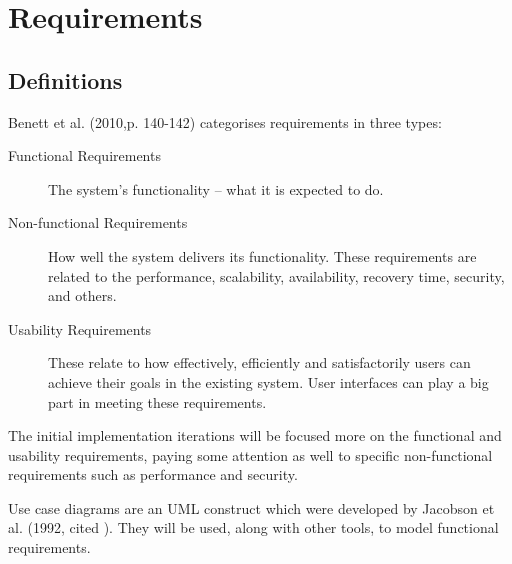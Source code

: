 \section{Requirements} \label{sec:Requirements}

\subsection{Definitions} \label{sec:Requirements.Definitions}
Benett et al. (2010,p. 140-142) \nocite{bennett2010object} categorises
requirements in three types:

\begin{description} \item[Functional Requirements]
    The system's functionality -- what it is expected to do.
    
  \item[Non-functional Requirements]
    How well the system delivers its functionality. These requirements are
    related to the performance, scalability, availability, recovery time,
    security, and others.

  \item[Usability Requirements]
    These relate to how effectively, efficiently and satisfactorily users can
    achieve their goals in the existing system. User interfaces can play a big
    part in meeting these requirements.
\end{description}

The initial implementation iterations will be focused more on the functional
and usability requirements, paying some attention as well to specific
non-functional requirements such as performance and security.

Use case diagrams are an UML construct which were developed by Jacobson et al.
(1992, cited \cite[][p.~154]{bennett2010object}). They will be used, along with
other tools, to model functional requirements.
